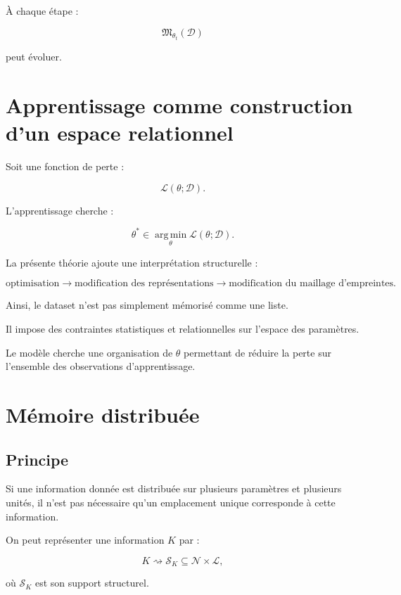 \documentclass[11pt,a4paper]{article}
\newcommand{\D}{\mathcal D}
\newcommand{\argmin}{\operatorname*{arg\,min}}
\begin{document}
À chaque étape :

\[
\mathfrak M_{\theta_t}(\D)
\]

peut évoluer.

\section{Apprentissage comme construction d'un espace relationnel}

Soit une fonction de perte :

\[
\mathcal L(\theta;\D).
\]

L'apprentissage cherche :

\[
\theta^\ast
\in
\argmin_\theta
\mathcal L(\theta;\D).
\]

La présente théorie ajoute une interprétation structurelle :

\[
\boxed{
\text{optimisation}
\rightarrow
\text{modification des représentations}
\rightarrow
\text{modification du maillage d'empreintes}.
}
\]

Ainsi, le dataset n'est pas simplement mémorisé comme une liste.

Il impose des contraintes statistiques et relationnelles sur l'espace des
paramètres.

Le modèle cherche une organisation de $\theta$ permettant de réduire la
perte sur l'ensemble des observations d'apprentissage.

\section{Mémoire distribuée}

\subsection{Principe}

Si une information donnée est distribuée sur plusieurs paramètres et
plusieurs unités, il n'est pas nécessaire qu'un emplacement unique
corresponde à cette information.

On peut représenter une information $K$ par :

\[
K
\rightsquigarrow
\mathcal S_K
\subseteq
\mathcal N\times\mathcal L,
\]

où $\mathcal S_K$ est son support structurel.
\end{document}

